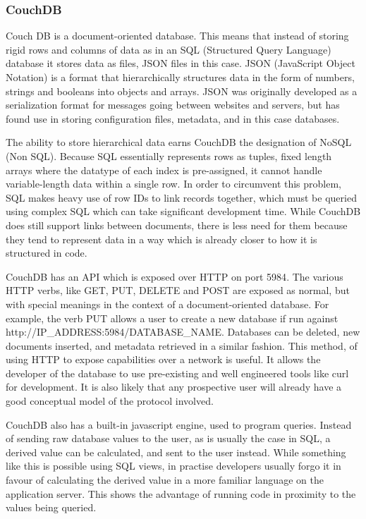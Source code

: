 \documentclass{article}
\begin{document}
\subsubsection{CouchDB}

Couch DB is a document-oriented database. This means that instead of storing rigid rows and columns of data as in an SQL (Structured Query Language) database it stores data as files, JSON files in this case. JSON (JavaScript Object Notation) is a format that hierarchically structures data in the form of numbers, strings and booleans into objects and arrays. JSON was originally developed as a serialization format for messages going between websites and servers, but has found use in storing configuration files, metadata, and in this case databases.

The ability to store hierarchical data earns CouchDB the designation of NoSQL (Non SQL). Because SQL essentially represents rows as tuples, fixed length arrays where the datatype of each index is pre-assigned, it cannot handle variable-length data within a single row. In order to circumvent this problem, SQL makes heavy use of row IDs to link records together, which must be queried using complex SQL which can take significant development time. While CouchDB does still support links between documents, there is less need for them because they tend to represent data in a way which is already closer to how it is structured in code.

CouchDB has an API which is exposed over HTTP on port 5984\cite{couch}. The various HTTP verbs, like GET, PUT, DELETE and POST are exposed as normal, but with special meanings in the context of a document-oriented database. For example, the verb PUT allows a user to create a new database if run against http://IP\_ADDRESS:5984/DATABASE\_NAME. Databases can be deleted, new documents inserted, and metadata retrieved in a similar fashion. This method, of using HTTP to expose capabilities over a network is useful. It allows the developer of the database to use pre-existing and well engineered tools like curl for development. It is also likely that any prospective user will already have a good conceptual model of the protocol involved.

CouchDB also has a built-in javascript engine, used to program queries. Instead of sending raw database values to the user, as is usually the case in SQL, a derived value can be calculated, and sent to the user instead. While something like this is possible using SQL views, in practise developers usually forgo it in favour of calculating the derived value in a more familiar language on the application server. This shows the advantage of running code in proximity to the values being queried.
\end{document}
